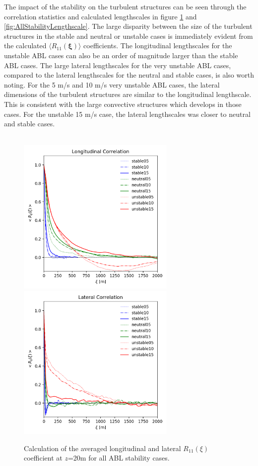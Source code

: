 The impact of the stability on the turbulent structures can be seen
through the correlation statistics and calculated lengthscales in
figure \ref{fig:AllStabilityRij} and
\ref{fig:AllStabilityLengthscale}.  The large disparity between the
size of the turbulent structures in the stable and neutral or unstable
cases is immediately evident from the calculated $\langle
R_{11}(\boldsymbol{\xi})\rangle$ coefficients.  The longitudinal
lengthscales for the unstable ABL cases can also be an order of
magnitude larger than the stable ABL cases.  The large lateral
lengthscales for the very unstable ABL cases, compared to the lateral
lengthscales for the neutral and stable cases, is also worth noting.
For the 5 m/s and 10 m/s very unstable ABL cases, the lateral
dimensions of the turbulent structures are similar to the longitudinal
lengthscale.  This is consistent with the large convective structures
which develops in those cases.  For the unstable 15 m/s case, the
lateral lengthscales was closer to neutral and stable cases.  

\begin{figure}[hbt!]
  \centering
   \\
  \includegraphics[width=3in]{figures/AllStability_Rij_Longitudinal.png}
  \includegraphics[width=3in]{figures/AllStability_Rij_Lateral.png}
  \caption{ \label{fig:AllStabilityRij} Calculation of the averaged
    longitudinal and lateral $R_{11}(\xi)$ coefficient at $z$=20m for
    all ABL stability cases.}
\end{figure}


